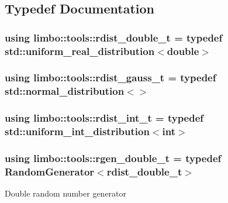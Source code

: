 \subsection{Typedef Documentation}
\hypertarget{group__tools_gab2609bfef1e3bdb8b44c0d6c8c139927}{}
\subsubsection[{rdist\+\_\+double\+\_\+t}]{\setlength{\rightskip}{0pt plus 5cm}using {\bf limbo\+::tools\+::rdist\+\_\+double\+\_\+t} = typedef std\+::uniform\+\_\+real\+\_\+distribution$<$double$>$}\label{group__tools_gab2609bfef1e3bdb8b44c0d6c8c139927}
\hypertarget{group__tools_ga38a794bf956d6bdd1e55f43357826b79}{}
\subsubsection[{rdist\+\_\+gauss\+\_\+t}]{\setlength{\rightskip}{0pt plus 5cm}using {\bf limbo\+::tools\+::rdist\+\_\+gauss\+\_\+t} = typedef std\+::normal\+\_\+distribution$<$$>$}\label{group__tools_ga38a794bf956d6bdd1e55f43357826b79}
\hypertarget{group__tools_gacb322b4600b2e500dbcd24661a749f49}{}
\subsubsection[{rdist\+\_\+int\+\_\+t}]{\setlength{\rightskip}{0pt plus 5cm}using {\bf limbo\+::tools\+::rdist\+\_\+int\+\_\+t} = typedef std\+::uniform\+\_\+int\+\_\+distribution$<$int$>$}\label{group__tools_gacb322b4600b2e500dbcd24661a749f49}
\hypertarget{group__tools_gacdb2963659056fc5fa9f94405f59a851}{}
\subsubsection[{rgen\+\_\+double\+\_\+t}]{\setlength{\rightskip}{0pt plus 5cm}using {\bf limbo\+::tools\+::rgen\+\_\+double\+\_\+t} = typedef Random\+Generator$<$rdist\+\_\+double\+\_\+t$>$}\label{group__tools_gacdb2963659056fc5fa9f94405f59a851}
Double random number generator \hypertarget{group__tools_ga8d175579a371b13f2209fc21850c067b}{}
